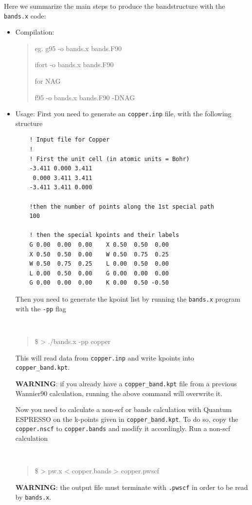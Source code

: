 \begin{tcolorbox}[colback=blue!5!white,title=BANDS.X MINITUTORIAL,float]
    {\small
    Here we summarize the main steps to produce the bandstructure with the {\tt bands.x} code:

	\begin{itemize}
	\item Compilation: {\tt \begin{quote}
     eg. g95 -o bands.x bands.F90

         ifort -o bands.x bands.F90


    for NAG

         f95 -o bands.x bands.F90 -DNAG
         \end{quote}

    }

    \item Usage: First you need to generate an {\tt copper.inp} file, with the following structure

    \begin{verbatim}
    ! Input file for Copper
    !
    ! First the unit cell (in atomic units = Bohr)
    -3.411 0.000 3.411
     0.000 3.411 3.411
    -3.411 3.411 0.000

    !then the number of points along the 1st special path
    100

    ! then the special kpoints and their labels
    G 0.00  0.00  0.00    X 0.50  0.50  0.00
    X 0.50  0.50  0.00    W 0.50  0.75  0.25
    W 0.50  0.75  0.25    L 0.00  0.50  0.00
    L 0.00  0.50  0.00    G 0.00  0.00  0.00
    G 0.00  0.00  0.00    K 0.00  0.50 -0.50
    \end{verbatim}

    Then you need to generate the kpoint list by running the {\tt bands.x} program with the {\tt -pp} flag
    {\tt
    \begin{quote}
     \$ > ./bands.x -pp copper
    \end{quote}
    }
    This will read data from {\tt copper.inp} and write kpoints into {\tt copper\_band.kpt}.

    {\bf WARNING}: if you already have a {\tt copper\_band.kpt} file from a previous Wannier90 calculation, running the above command will overwrite it.

    Now you need to calculate a non-scf or bands calculation with Quantum ESPRESSO on the k-points given in {\tt copper\_band.kpt}. To do so, copy the {\tt copper.nscf} to {\tt copper.bands} and modify it accordingly. Run a non-scf calculation
    {\tt
    \begin{quote}
    \$ > pw.x < copper.bands > copper.pwscf
    \end{quote}
    }
    {\bf WARNING}: the output file must terminate with {\tt .pwscf} in order to be read by {\tt bands.x}.


\end{itemize}}
\end{tcolorbox}
